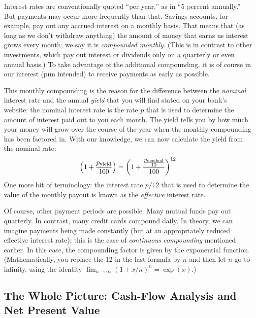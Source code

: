 Interest rates are conventionally quoted ``per year,'' as in ``5
percent annually.'' But payments may occur more frequently than that.
Savings accounts, for example, pay out any accrued interest on a
monthly basis. That means that (as long as we don't withdraw anything)
the amount of money that earns us interest grows every month; we say
it is \emph{compounded monthly}. (This is in contrast to other
investments, which pay out interest or dividends only on a quarterly
or even annual basis.) To take advantage of the additional
compounding, it is of course in our interest (pun intended) to receive
payments as early as possible.
  
This monthly compounding is the reason for the difference between the
\emph{nominal} interest rate and the annual \emph{yield} that you will
find stated on your bank's website: the nominal interest rate is the
rate $p$ that is used to determine the amount of interest paid
out to you each month. The yield tells you by how much your money will
grow over the course of the year when the monthly compounding has
been factored in. With our knowledge, we can now calculate the yield
from the nominal rate:
%
\[
\left( 1 + \frac{p_{{\rm yield}}}{100} \right) 
 = \left( 1 + \frac{ \frac{p_{{\rm nominal}}}{12}}{100} \right)^{12} 
\]
%
One more bit of terminology: the interest rate $p/12$ that is used to
determine the value of the monthly payout is known as the
\emph{effective} interest rate.
    
Of course, other payment periods are possible. Many mutual funds pay
out quarterly. In contrast, many credit cards compound daily.  In
theory, we can imagine payments being made constantly (but at an
appropriately reduced effective interest rate); this is the case of
\emph{continuous compounding} mentioned earlier. In this case, the
compounding factor is given by the exponential function.
(Mathematically, you replace the 12 in the last formula by $n$ and
then let $n$ go to infinity, using the identity $\lim_{n \to \infty}
(1 + x/n)^n = \exp(x)$.)


\subsection{The Whole Picture: Cash-Flow Analysis and Net Present Value}

 
